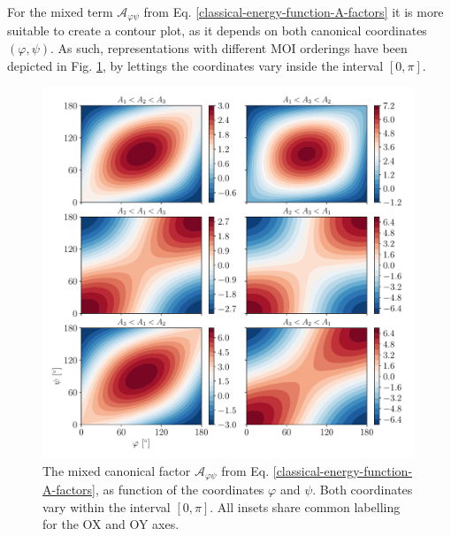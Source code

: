 For the mixed term $\mathcal{A}_{\varphi\psi}$ from Eq. \ref{classical-energy-function-A-factors} it is more suitable to create a contour plot, as it depends on both canonical coordinates $(\varphi,\psi)$. As such, representations with different MOI orderings have been depicted in Fig. \ref{fig-A-mixed-canonical}, by lettings the coordinates vary inside the interval $[0,\pi]$.
\begin{figure}
    \centering
    \includegraphics[width=0.99\textwidth]{Chapters/Figures/A_mixed.pdf}
    \caption{The mixed canonical factor $\mathcal{A}_{\varphi\psi}$ from Eq. \ref{classical-energy-function-A-factors}, as function of the coordinates $\varphi$ and $\psi$. Both coordinates vary within the interval $[0,\pi]$. All insets share common labelling for the OX and OY axes.}
    \label{fig-A-mixed-canonical}
\end{figure}

